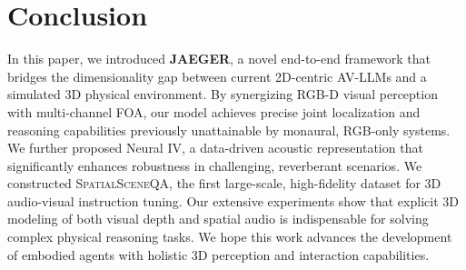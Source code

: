 \section{Conclusion}
In this paper, we introduced \textbf{JAEGER}, a novel end-to-end framework that bridges the dimensionality gap between current 2D-centric AV-LLMs and a simulated 3D physical environment. By synergizing RGB-D visual perception with multi-channel FOA, our model achieves precise joint localization and reasoning capabilities previously unattainable by monaural, RGB-only systems. We further proposed Neural IV, a data-driven acoustic representation that significantly enhances robustness in challenging, reverberant scenarios. We constructed \textsc{SpatialSceneQA}, the first large-scale, high-fidelity dataset for 3D audio-visual instruction tuning. Our extensive experiments show that explicit 3D modeling of both visual depth and spatial audio is indispensable for solving complex physical reasoning tasks. We hope this work advances the development of embodied agents with holistic 3D perception and interaction capabilities.
